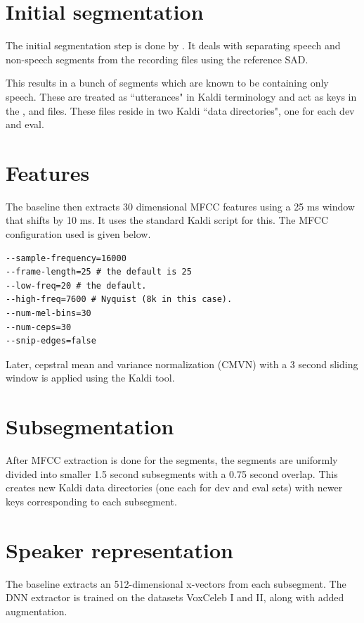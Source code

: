 \section{Initial segmentation}
The initial segmentation step is done by . It deals with separating speech and non-speech segments from the recording files using the reference SAD.

This results in a bunch of segments which are known to be containing only speech. These are treated as ``utterances" in Kaldi terminology and act as keys in the ,  and  files. These files reside in two Kaldi ``data directories", one for each dev and eval.

\section{Features}
The baseline then extracts 30 dimensional MFCC features using a 25 ms window that shifts by 10 ms. It uses the standard  Kaldi script for this. The MFCC configuration used  is given below.

\begin{verbatim}
--sample-frequency=16000
--frame-length=25 # the default is 25
--low-freq=20 # the default.
--high-freq=7600 # Nyquist (8k in this case).
--num-mel-bins=30
--num-ceps=30
--snip-edges=false
\end{verbatim}

Later, cepstral mean and variance normalization (CMVN) with a 3 second sliding window is applied using the  Kaldi tool.

\section{Subsegmentation}
After MFCC extraction is done for the segments, the segments are uniformly divided into smaller 1.5 second subsegments with a 0.75 second overlap. This creates new Kaldi data directories (one each for dev and eval sets) with newer keys corresponding to each subsegment.

\section{Speaker representation}
The baseline extracts an 512-dimensional x-vectors from each subsegment. The DNN extractor  is trained on the datasets VoxCeleb I and II, along with added augmentation.

